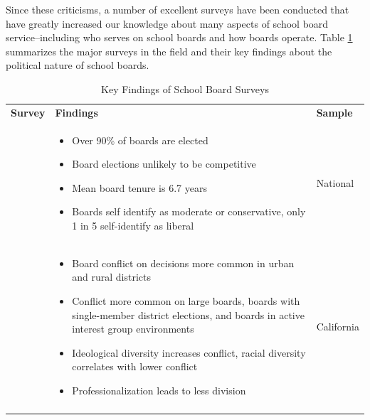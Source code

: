Since these criticisms, a number of excellent surveys have been conducted that have greatly increased our knowledge about many aspects of school board service--including who serves on school boards and how boards operate. Table \ref{sbsurveys2} summarizes the major surveys in the field and their key findings about the political nature of school boards. 


\begin{small}
\begin{singlespace}
\begin{longtable}{| p{} | p{} | p{}|}
\hline

\caption{Key Findings of School Board Surveys} 
\label{sbsurveys2}\\ \hline
\textbf{Survey}  & \textbf{Findings} & \textbf{Sample} \\ \hline \endhead
\citet{RefWorks:321}  &  \vspace{-6mm} \begin{itemize} \setlength\itemsep{-2pt}
\item Over 90\% of boards are elected 
\item Board elections unlikely to be competitive \item Mean board tenure is 6.7 years 
\item Boards self identify as moderate or conservative, only 1 in 5 self-identify as liberal 
\end{itemize} \vspace{-4mm} & National \\ \hline
\citet{RefWorks:264} & \vspace{-6mm} \begin{itemize} \setlength\itemsep{-2pt}
\item Board conflict on decisions more 
common in urban and rural districts \item Conflict more common on large boards, boards with single-member district elections, 
and boards in active interest group environments \item Ideological diversity increases conflict, racial diversity correlates 
with lower conflict \item Professionalization leads to less division 
\end{itemize} \vspace{-4mm} & California \\ \hline
\citet{RefWorks:322} & \vspace{-6mm} \begin{itemize}

\end{itemize}
\end{longtable}
\end{singlespace}
\end{small}
